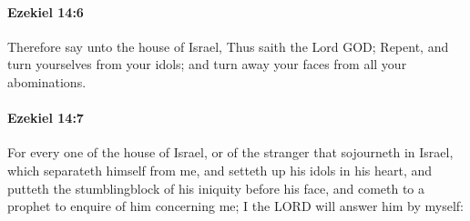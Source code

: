 		\paragraph{Ezekiel 14:6} %
			\label{EZEKIEL-14-6}

			Therefore say unto the house of Israel, Thus saith the Lord GOD; Repent, and turn yourselves from your idols; and turn away your faces from all your abominations.


		\paragraph{Ezekiel 14:7} %
			\label{EZEKIEL-14-7}

			For every one of the house of Israel, or of the stranger that sojourneth in Israel, which separateth himself from me, and setteth up his idols in his heart, and putteth the stumblingblock of his iniquity before his face, and cometh to a prophet to enquire of him concerning me; I the LORD will answer him by myself:

